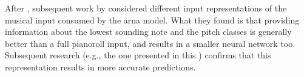 

After \textcite{chen2018functional}, subsequent work by
\textcite{micchi2020not} considered different input
representations of the musical input consumed by the
\gls{arna} model. What they found is
that providing information about the lowest sounding note
and the pitch classes is generally better than a full
pianoroll input, and results in a smaller neural network
too. Subsequent research (e.g., the one presented in this
\thesisdiss{}) confirms that this representation results in
more accurate predictions.
